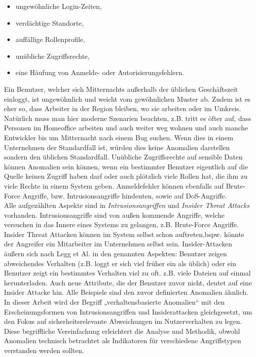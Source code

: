 \documentclass[a4paper,12pt]{article}
\begin{document}
	\begin{itemize}
		\item ungewöhnliche Login-Zeiten,
		\item verdächtige Standorte,
		\item auffällige Rollenprofile,
		\item unübliche Zugriffsrechte,
		\item eine Häufung von Anmelde- oder Autorisierungsfehlern.
	\end{itemize}
	Ein Benutzer, welcher sich Mitternachts außerhalb der üblichen Geschäftszeit einloggt, ist ungewöhnlich und weicht vom gewöhnlichen Muster ab. Zudem ist es eher so, dass Arbeiter in der Region bleiben, wo sie arbeiten oder im Umkreis. Natürlich muss man hier moderne Szenarien beachten, z.B. tritt es öfter auf, dass Personen im Homeoffice arbeiten und auch weiter weg wohnen und auch manche Entwickler bis um Mitternacht nach einem Bug suchen. Wenn dies in einem Unternehmen der Standardfall ist, würden dies keine Anomalien darstellen sondern den üblichen Standardfall. Unübliche Zugriffsrechte auf sensible Daten können Anomalien sein können, wenn ein bestimmter Benutzer eigentlich auf die Quelle keinen Zugriff haben darf oder auch plötzlich viele Rollen hat, die ihm zu viele Rechte in einem System geben. Anmeldefehler können ebenfalls auf Brute-Force Angriffe, bzw. Intrusionsangriffe hindeuten, sowie auf DoS-Angriffe.
	\\[0.5em]
	Alle aufgezählten Aspekte sind in \textit{Intrusionsangriffen} und \textit{Insider Threat Attacks} vorhanden. Intrusionsangriffe sind von außen kommende Angriffe,  welche versuchen in das Innere eines Systems zu gelangen, z.B. Brute-Force Angriffe. Insider Threat Attacken können im System selbst schon auftreten,bspw. könnte der Angreifer ein Mitarbeiter im Unternehmen selbst sein.
	Insider-Attacken äußern sich nach Legg et Al. \cite[S.2]{legg2015visualizing} in den genannten Aspekten: Benutzer zeigen abweichendes Verhalten (z.B. loggt er sich viel früher ein als üblich) oder ein Benutzer zeigt ein bestimmtes Verhalten viel zu oft. z.B. viele Dateien auf einmal herunterladen. Auch neue Attribute, die der Benutzer zuvor nicht, deutet auf eine Insider Attacke hin. Alle Beispiele sind den zuvor definierten Anomalien ähnlich.
	\\[0.5em]
	In dieser Arbeit wird der Begriff „verhaltensbasierte Anomalien“ mit den Erscheinungsformen von Intrusionsangriffen und Insiderattacken gleichgesetzt, um den Fokus auf sicherheitsrelevante Abweichungen im Nutzerverhalten zu legen. Diese begriffliche Vereinfachung erleichtert die Analyse und Methodik, obwohl Anomalien technisch betrachtet als Indikatoren für verschiedene Angriffstypen verstanden werden sollten.
\end{document}
